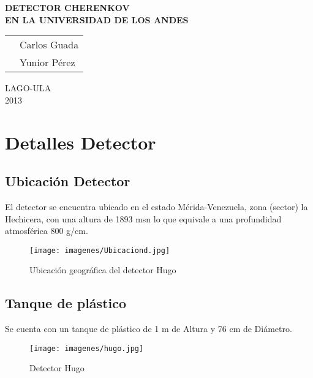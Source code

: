 \documentclass[spanish,notitlepage,letterpaper,12pt]{article} %
\begin{document}
\begin{titlepage}
\begin{center}

{\LARGE{\bf{DETECTOR CHERENKOV}}} \vspace{2mm} \\
{\large{\bf{EN LA UNIVERSIDAD DE LOS ANDES}}}
\vfill
{\large
\begin{tabular}{rl}
{\sc } & {\sc Carlos Guada}
\vspace{1mm} \\
{\sc } & {\sc Yunior Pérez}
\end{tabular}}
\vfill
{\sc LAGO-ULA} \\

\vspace{10mm}
{\Large 2013} 
\end{center}
\end{titlepage}

\tableofcontents

\newpage
\pagestyle{plain}
\setcounter{page}{1}

\section{Detalles Detector}

 \subsection{Ubicación Detector}
El detector se encuentra ubicado en el estado Mérida-Venezuela, zona (sector) la Hechicera,
con una altura de 1893 msn lo que equivale a una profundidad atmosférica 800 g/cm.

      \begin{figure}[htp!]
        \centering
        \texttt{[image: imagenes/Ubicaciond.jpg]}
        \caption{Ubicación geográfica del detector Hugo}
        \end{figure}  

 \subsection{ Tanque de plástico}
 
 Se cuenta con un tanque de plástico de 1 m de Altura y 76 cm de Diámetro.\\
 
   \begin{figure}[htp!]
        \centering
        \texttt{[image: imagenes/hugo.jpg]}
        \caption{Detector Hugo}
        \end{figure}  
\end{document}
